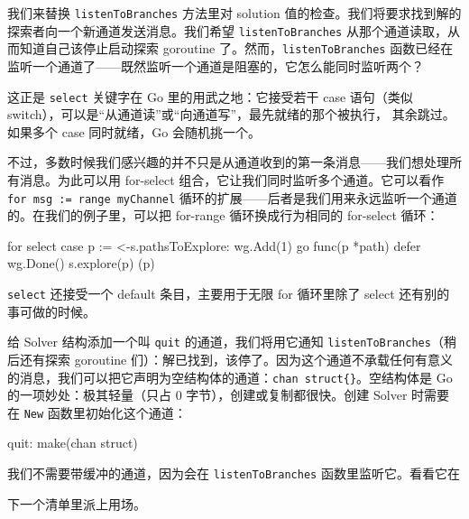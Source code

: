 我们来替换 \texttt{listenToBranches} 方法里对 solution 值的检查。我们将要求找到解的探索者向一个新通道发送消息。我们希望 \texttt{listenToBranches} 从那个通道读取，从而知道自己该停止启动探索 goroutine 了。然而，\texttt{listenToBranches} 函数已经在监听一个通道了——既然监听一个通道是阻塞的，它怎么能同时监听两个？

这正是 \texttt{select} 关键字在 Go 里的用武之地：它接受若干 case 语句（类似 switch），可以是``从通道读''或``向通道写''，最先就绪的那个被执行，
其余跳过。如果多个 case 同时就绪，Go 会随机挑一个。

不过，多数时候我们感兴趣的并不只是从通道收到的第一条消息——我们想处理所有消息。为此可以用 for-select 组合，它让我们同时监听多个通道。它可以看作 \texttt{for msg := range myChannel} 循环的扩展——后者是我们用来永远监听一个通道的。在我们的例子里，可以把 for-range 循环换成行为相同的 for-select 循环：

\begin{gocode}[]
for {
    select {
    case p := <-s.pathsToExplore:
        wg.Add(1)
        go func(p *path) {
            defer wg.Done()
            s.explore(p)
        }(p)
    }
}
\end{gocode}

\texttt{select} 还接受一个 default 条目，主要用于无限 for 循环里除了 select 还有别的事可做的时候。

给 Solver 结构添加一个叫 \texttt{quit} 的通道，我们将用它通知 \texttt{listenToBranches}（稍后还有探索 goroutine 们）：解已找到，该停了。因为这个通道不承载任何有意义的消息，我们可以把它声明为空结构体的通道：\texttt{chan struct\{\}}。空结构体是 Go 的一项妙处：极其轻量（只占 0 字节），创建或复制都很快。创建 Solver 时需要在 \texttt{New} 函数里初始化这个通道：

\begin{gocode}[]
quit: make(chan struct{})
\end{gocode}

我们不需要带缓冲的通道，因为会在 \texttt{listenToBranches} 函数里监听它。看看它在

下一个清单里派上用场。


